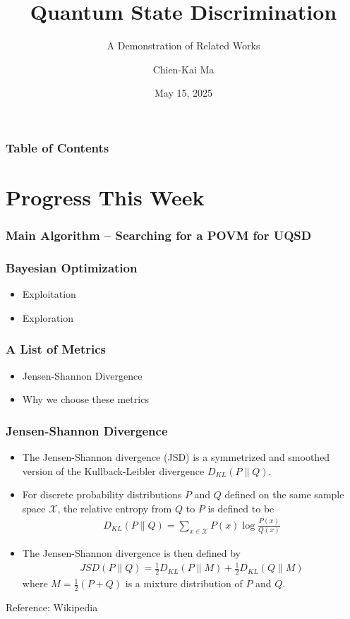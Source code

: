 \documentclass{beamer}
\title{Quantum State Discrimination}
\subtitle{A Demonstration of Related Works}
\author{Chien-Kai Ma}
\institute{NTU GIEE}
\date{May 15, 2025}
\begin{document}
\begin{frame}
  \titlepage
\end{frame}

\begin{frame}
  \frametitle{Table of Contents}
  \tableofcontents
\end{frame}


\section{Progress This Week}
\begin{frame}
  \frametitle{Main Algorithm -- Searching for a POVM for UQSD}
  \begin{center}
    \scalebox{0.45}{
      
    }
  \end{center}
\end{frame}

\begin{frame}
  \frametitle{Bayesian Optimization}
  \begin{itemize}
    \item Exploitation
    \item Exploration
  \end{itemize}
\end{frame}

\begin{frame}
  \frametitle{A List of Metrics}
  \begin{itemize}
    \item Jensen-Shannon Divergence
    \item Why we choose these metrics
  \end{itemize}
\end{frame}

\begin{frame}
  \frametitle{Jensen-Shannon Divergence}
  \begin{itemize}
    \item The Jensen-Shannon divergence (JSD) is a symmetrized and smoothed version of the Kullback-Leibler divergence
          $D_{KL}(P\parallel Q)$.
    \item For discrete probability distributions $P$ and $Q$
          defined on the same sample space $\mathcal{X}$, the
          relative entropy from $Q$ to $P$ is defined to be
          \begin{align}
            D_{KL}(P \parallel Q) = \sum_{x \in \mathcal{X}} P(x) \log {\frac{P(x)}{Q(x)}}
          \end{align}
    \item The Jensen-Shannon divergence is then defined by
          \begin{align}
            JSD(P\parallel Q) = \frac{1}{2}D_{KL}(P\parallel M) + \frac{1}{2}D_{KL}(Q\parallel M)
          \end{align}
          where $M = \frac{1}{2}(P + Q)$ is a mixture distribution of
          $P$ and $Q$.\\
  \end{itemize}
  \tiny{Reference: Wikipedia}
\end{frame}
\end{document}
